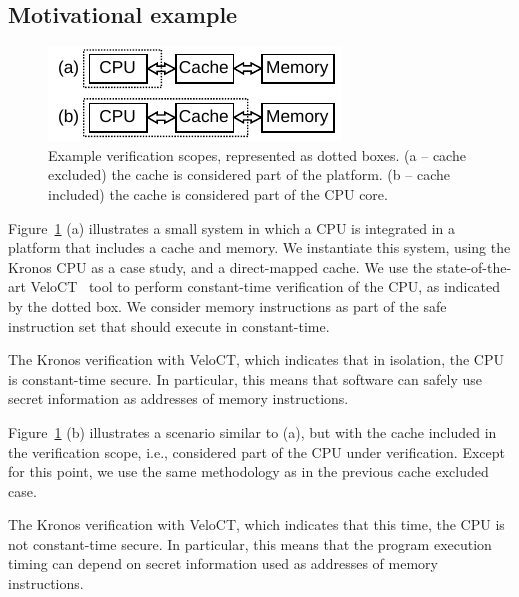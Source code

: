 \subsection{Motivational example}

\begin{figure}[t]
    \begin{center}
    \includegraphics[width=0.8\columnwidth]{figures/verifscopecache/verifscopecache.pdf}
    \end{center}
    \vspace*{-1em}
    \caption{\label{fig:verifscopecache}
        Example verification scopes, represented as dotted boxes. (a -- cache excluded) the cache is considered part of the platform. (b -- cache included) the cache is considered part of the CPU core.
    }
    \vspace*{-1em}
\end{figure}


Figure~\ref{fig:verifscopecache} (a) illustrates a small system in which a CPU is integrated in a platform that includes a cache and memory.
We instantiate this system, using the Kronos CPU as a case study, and a direct-mapped cache.
We use the state-of-the-art VeloCT~\cite{dinesh2025h} tool to perform constant-time verification of the CPU, as indicated by the dotted box.
We consider memory instructions as part of the safe instruction set that should execute in constant-time.

The Kronos verification with VeloCT, which indicates that in isolation, the CPU is constant-time secure.
In particular, this means that software can safely use secret information as addresses of memory instructions.

Figure~\ref{fig:verifscopecache} (b) illustrates a scenario similar to (a), but with the cache included in the verification scope, i.e., considered part of the CPU under verification.
Except for this point, we use the same methodology as in the previous cache excluded case.

The Kronos verification with VeloCT, which indicates that this time, the CPU is not constant-time secure.
In particular, this means that the program execution timing can depend on secret information used as addresses of memory instructions.

